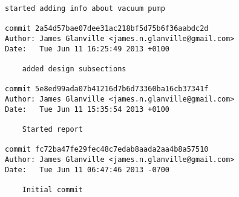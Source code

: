 \documentclass[a4paper,11pt]{article}  %
\begin{document}
\begin{lstlisting}[frame=single]
    started adding info about vacuum pump

commit 2a54d57bae07dee31ac218bf5d75b6f36aabdc2d
Author: James Glanville <james.n.glanville@gmail.com>
Date:   Tue Jun 11 16:25:49 2013 +0100

    added design subsections

commit 5e8ed99ada07b41216d7b6d73360ba16cb37341f
Author: James Glanville <james.n.glanville@gmail.com>
Date:   Tue Jun 11 15:35:54 2013 +0100

    Started report

commit fc72ba47fe29fec48c7edab8aada2aa4b8a57510
Author: James Glanville <james.n.glanville@gmail.com>
Date:   Tue Jun 11 06:47:46 2013 -0700

    Initial commit
\end{lstlisting}
\end{document}

